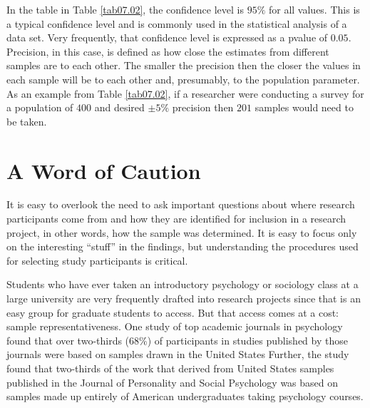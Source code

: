 In the table in Table \ref{tab07.02}, the confidence level is $ 95\% $ for all values. This is a typical confidence level and is commonly used in the statistical analysis of a data set. Very frequently, that confidence level is expressed as a \gls{pvalue} of $ 0.05 $. Precision, in this case, is defined as how close the estimates from different samples are to each other. The smaller the precision then the closer the values in each sample will be to each other and, presumably, to the population parameter. As an example from Table \ref{tab07.02}, if a researcher were conducting a survey for a population of $ 400 $ and desired $ \pm5\% $ precision then $ 201 $ samples would need to be taken.

\section{A Word of Caution}

It is easy to overlook the need to ask important questions about where research participants come from and how they are identified for inclusion in a research project, in other words, how the sample was determined. It is easy to focus only on the interesting ``stuff'' in the findings, but understanding the procedures used for selecting study participants is critical.

Students who have ever taken an introductory psychology or sociology class at a large university are very frequently drafted into research projects since that is an easy group for graduate students to access. But that access comes at a cost: sample representativeness. One study of top academic journals in psychology found that over two-thirds ($ 68\% $) of participants in studies published by those journals were based on samples drawn in the United States\cite{arnett2008neglected} Further, the study found that two-thirds of the work that derived from United States samples published in the Journal of Personality and Social Psychology was based on samples made up entirely of American undergraduates taking psychology courses.


